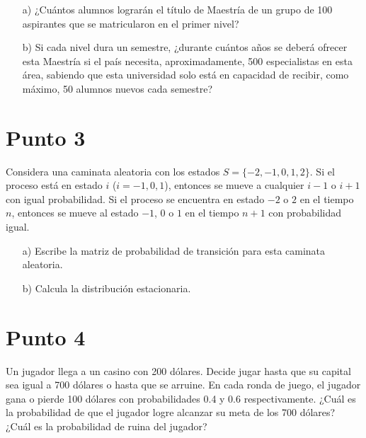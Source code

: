 \documentclass{article}
\begin{document}
\begin{enumerate}
    \item[a)] ¿Cuántos alumnos lograrán el título de Maestría de un grupo de 100 aspirantes que se matricularon en el primer nivel?
    \item[b)] Si cada nivel dura un semestre, ¿durante cuántos años se deberá ofrecer esta Maestría si el país necesita, aproximadamente, 500 especialistas en esta área, sabiendo que esta universidad solo está en capacidad de recibir, como máximo, 50 alumnos nuevos cada semestre?
\end{enumerate}

\section*{Punto 3}

Considera una caminata aleatoria con los estados $S=\{-2,-1,0,1,2\}$. Si el proceso está en estado $i$ ($i=-1,0,1$), entonces se mueve a cualquier $i-1$ o $i+1$ con igual probabilidad. Si el proceso se encuentra en estado $-2$ o $2$ en el tiempo $n$, entonces se mueve al estado $-1$, $0$ o $1$ en el tiempo $n+1$ con probabilidad igual.

\begin{enumerate}
    \item[a)] Escribe la matriz de probabilidad de transición para esta caminata aleatoria.
    \item[b)] Calcula la distribución estacionaria.
\end{enumerate}

\section*{Punto 4}

Un jugador llega a un casino con 200 dólares. Decide jugar hasta que su capital sea igual a 700 dólares o hasta que se arruine. En cada ronda de juego, el jugador gana o pierde 100 dólares con probabilidades 0.4 y 0.6 respectivamente. ¿Cuál es la probabilidad de que el jugador logre alcanzar su meta de los 700 dólares? ¿Cuál es la probabilidad de ruina del jugador?
\end{document}
